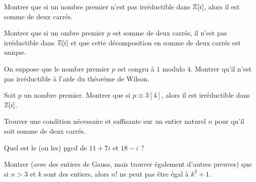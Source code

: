 
\begin{exo}
Montrer que si un nombre premier n'est pas irréductible dans $\mathbb Z[i]$, alors il est somme de deux carrés.
\end{exo}

\begin{exo}
Montrer que si un ombre premier $p$ est somme de deux carrés, il n'est pas irréductible dans $\mathbb Z[i]$ et que cette décomposition en somme de deux carrés est unique.
\end{exo}

\begin{exo}
On suppose que le nombre premier $p$ est congru à $1$ modulo $4$.
Montrer qu'il n'est pas irréductible à l'aide du théorème de Wilson.
\end{exo}

\begin{exo}
Soit $p$ un nombre premier. Montrer que si $p\equiv 3 [4]$, alors il est irréductible dans $\mathbb Z[i]$.
\end{exo}


\begin{exo}
Trouver une condition nécessaire et suffisante sur un entier naturel $n$ pour qu'il soit somme de deux carrés.
\end{exo}


\begin{exo}
Quel est le (ou les) pgcd de $11+7i$ et $18-i$ ?
\end{exo}





\begin{exo}
Montrer (avec des entiers de Gauss, mais trouver également d'autres preuves) que si $n>3$ et $k$ sont des entiers, alors $n!$ ne peut pas être égal à $k^2+1$.
\end{exo}

